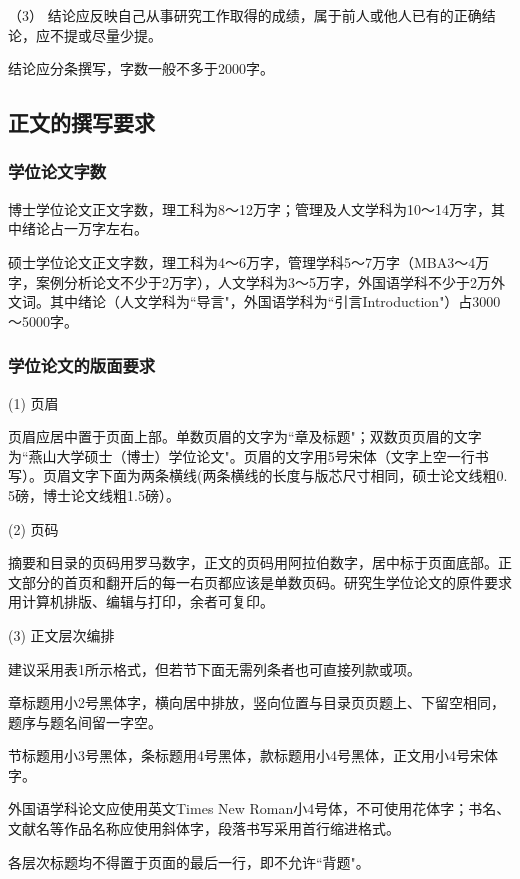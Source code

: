 （3）	结论应反映自己从事研究工作取得的成绩，属于前人或他人已有的正确结论，应不提或尽量少提。

结论应分条撰写，字数一般不多于2000字。


\subsection{正文的撰写要求}\label{appendixA-6-2}

\subsubsection{学位论文字数}\label{appendixA-6-2-1} 
博士学位论文正文字数，理工科为8～12万字；管理及人文学科为10～14万字，其中绪论占一万字左右。

硕士学位论文正文字数，理工科为4～6万字，管理学科5～7万字（MBA3～4万字，案例分析论文不少于2万字），人文学科为3～5万字，外国语学科不少于2万外文词。其中绪论（人文学科为``导言"，外国语学科为``引言Introduction"）占3000～5000字。

\subsubsection{学位论文的版面要求}\label{appendixA-6-2-2}

(1) 页眉

页眉应居中置于页面上部。单数页眉的文字为``章及标题"；双数页页眉的文字为``燕山大学硕士（博士）学位论文"。页眉的文字用5号宋体（文字上空一行书写）。页眉文字下面为两条横线(两条横线的长度与版芯尺寸相同，硕士论文线粗0. 5磅，博士论文线粗1.5磅）。

(2) 页码

摘要和目录的页码用罗马数字，正文的页码用阿拉伯数字，居中标于页面底部。正文部分的首页和翻开后的每一右页都应该是单数页码。研究生学位论文的原件要求用计算机排版、编辑与打印，余者可复印。

(3) 正文层次编排

建议采用表1所示格式，但若节下面无需列条者也可直接列款或项。

章标题用小2号黑体字，横向居中排放，竖向位置与目录页页题上、下留空相同，题序与题名间留一字空。

节标题用小3号黑体，条标题用4号黑体，款标题用小4号黑体，正文用小4号宋体字。

外国语学科论文应使用英文Times New Roman小4号体，不可使用花体字；书名、文献名等作品名称应使用斜体字，段落书写采用首行缩进格式。

各层次标题均不得置于页面的最后一行，即不允许``背题"。

